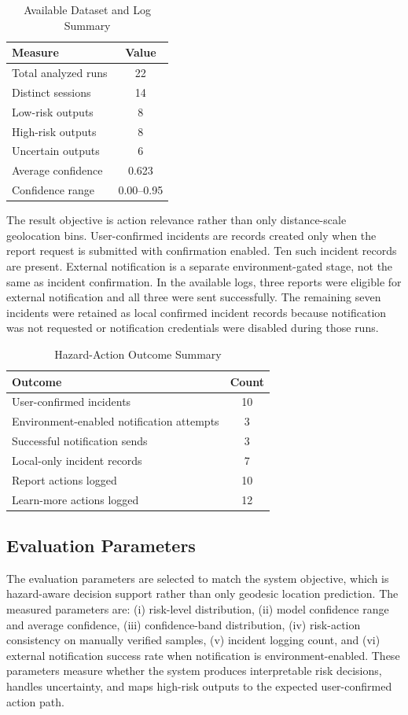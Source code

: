 \documentclass[10pt,conference]{IEEEtran}
\begin{document}
\begin{table}[h]
\caption{Available Dataset and Log Summary}
\centering
\begin{tabular}{lc}
\toprule
\textbf{Measure} & \textbf{Value} \\
\midrule
Total analyzed runs & 22 \\
Distinct sessions & 14 \\
Low-risk outputs & 8 \\
High-risk outputs & 8 \\
Uncertain outputs & 6 \\
Average confidence & 0.623 \\
Confidence range & 0.00--0.95 \\
\bottomrule
\end{tabular}
\end{table}

The result objective is action relevance rather than only distance-scale geolocation bins. User-confirmed incidents are records created only when the report request is submitted with confirmation enabled. Ten such incident records are present. External notification is a separate environment-gated stage, not the same as incident confirmation. In the available logs, three reports were eligible for external notification and all three were sent successfully. The remaining seven incidents were retained as local confirmed incident records because notification was not requested or notification credentials were disabled during those runs.

\begin{table}[h]
\caption{Hazard-Action Outcome Summary}
\centering
\begin{tabular}{lc}
\toprule
\textbf{Outcome} & \textbf{Count} \\
\midrule
User-confirmed incidents & 10 \\
Environment-enabled notification attempts & 3 \\
Successful notification sends & 3 \\
Local-only incident records & 7 \\
Report actions logged & 10 \\
Learn-more actions logged & 12 \\
\bottomrule
\end{tabular}
\end{table}

\subsection{Evaluation Parameters}
The evaluation parameters are selected to match the system objective, which is hazard-aware decision support rather than only geodesic location prediction. The measured parameters are: (i) risk-level distribution, (ii) model confidence range and average confidence, (iii) confidence-band distribution, (iv) risk-action consistency on manually verified samples, (v) incident logging count, and (vi) external notification success rate when notification is environment-enabled. These parameters measure whether the system produces interpretable risk decisions, handles uncertainty, and maps high-risk outputs to the expected user-confirmed action path.
\end{document}
